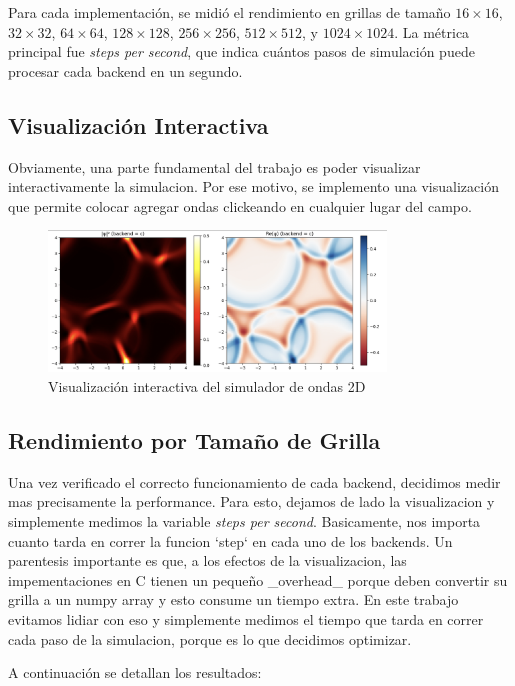 \documentclass[a4paper]{article}
\begin{document}
Para cada implementación, se midió el rendimiento en grillas de tamaño $16 \times 16$, $32 \times 32$, $64 \times 64$, $128 \times 128$, $256 \times 256$, $512 \times 512$, y $1024 \times 1024$. La métrica principal fue \textit{steps per second}, que indica cuántos pasos de simulación puede procesar cada backend en un segundo.



\subsection{Visualización Interactiva}
Obviamente, una parte fundamental del trabajo es poder visualizar interactivamente la simulacion. Por ese motivo, se implemento una visualización que permite colocar
agregar ondas clickeando en cualquier lugar del campo.

\begin{figure}[h]
    \centering
    \includegraphics[width=0.8\textwidth]{images/live_visualization.png}
    \caption{Visualización interactiva del simulador de ondas 2D}
    \label{fig:live_visualization}
\end{figure}

\subsection{Rendimiento por Tamaño de Grilla}
Una vez verificado el correcto funcionamiento de cada backend, decidimos medir mas precisamente la performance. Para esto, dejamos de lado la visualizacion y simplemente
medimos la variable \textit{steps per second}. Basicamente, nos importa cuanto tarda en correr la funcion `step` en cada uno de los backends. Un parentesis importante es
que, a los efectos de la visualizacion, las impementaciones en C tienen un pequeño _overhead_ porque deben convertir su grilla a un numpy array y esto consume un tiempo extra.
En este trabajo evitamos lidiar con eso y simplemente medimos el tiempo que tarda en correr cada paso de la simulacion, porque es lo que decidimos optimizar.

A continuación se detallan los resultados:
\end{document}
